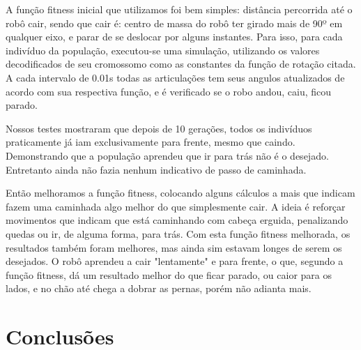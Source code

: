 \documentclass[twoside,conference,a4paper]{IEEEtran}
\begin{document}
A função fitness inicial que utilizamos foi bem simples: distância percorrida até o robô cair, sendo que cair é: centro de massa do robô ter girado mais de 90º em qualquer eixo, e parar de se deslocar por alguns instantes. Para isso, para cada indivíduo da população, executou-se uma simulação, utilizando os valores decodificados de seu cromossomo como as constantes da função de rotação citada. A cada intervalo de 0.01s todas as articulações tem seus angulos atualizados de acordo com sua respectiva função, e é verificado se o robo andou, caiu, ficou parado.

Nossos testes mostraram que depois de 10 gerações, todos os indivíduos praticamente já iam exclusivamente para frente, mesmo que caindo. Demonstrando que a população aprendeu que ir para trás não é o desejado. Entretanto ainda não fazia nenhum indicativo de passo de caminhada.

Então melhoramos a função fitness, colocando alguns cálculos a mais que indicam fazem uma caminhada algo melhor do que simplesmente cair. A ideia é reforçar movimentos que indicam que está caminhando com cabeça erguida, penalizando quedas ou ir, de alguma forma, para trás. Com esta função fitness melhorada, os resultados também foram melhores, mas ainda sim estavam longes de serem os desejados. O robô aprendeu a cair "lentamente" e para frente, o que, segundo a função fitness, dá um resultado melhor do que ficar parado, ou caior para os lados, e no chão até chega a dobrar as pernas, porém não adianta mais.

\section{Conclusões} \label{conclusoes}

\nocite{Aula}



\end{document}
